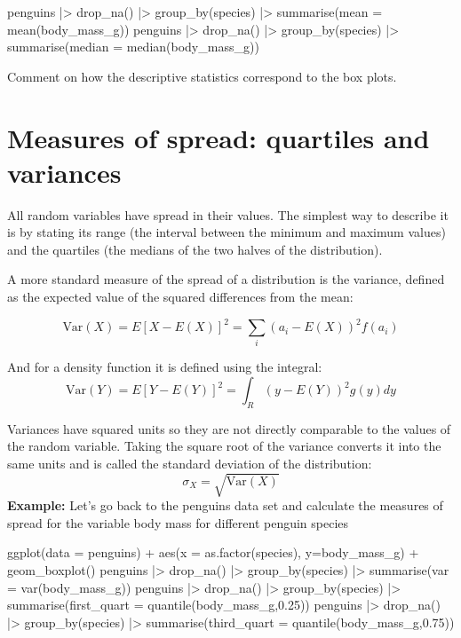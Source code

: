 \documentclass[
  letterpaper,
  DIV=11,
  numbers=noendperiod]{scrreprt}
\newenvironment{Shaded}{\begin{snugshade}}{\end{snugshade}}
\newcommand{\NormalTok}[1]{\textcolor[rgb]{0.00,0.23,0.31}{#1}}
\begin{document}
\begin{Shaded}
\begin{Highlighting}[]
\NormalTok{penguins |\textgreater{} drop\_na() |\textgreater{} group\_by(species) |\textgreater{} summarise(mean = mean(body\_mass\_g))}
\NormalTok{penguins |\textgreater{} drop\_na()  |\textgreater{} group\_by(species) |\textgreater{} summarise(median = median(body\_mass\_g))}
\end{Highlighting}
\end{Shaded}

Comment on how the descriptive statistics correspond to the box plots.

\section{Measures of spread: quartiles and
variances}\label{measures-of-spread-quartiles-and-variances}

All random variables have spread in their values. The simplest way to
describe it is by stating its range (the interval between the minimum
and maximum values) and the quartiles (the medians of the two halves of
the distribution).

A more standard measure of the spread of a distribution is the variance,
defined as the expected value of the squared differences from the mean:

\[\text{Var}(X) = E [X - E(X)]^2 = \sum_i (a_i- E(X))^2 f(a_i)\]

And for a density function it is defined using the integral:
\[\text{Var}(Y) =  E[ Y - E(Y)]^2 = \int_R (y-E(Y))^2 g(y) dy \]

Variances have squared units so they are not directly comparable to the
values of the random variable. Taking the square root of the variance
converts it into the same units and is called the standard deviation of
the distribution: \[ \sigma_X = \sqrt{\text{Var}(X)}\] \textbf{Example:}
Let's go back to the penguins data set and calculate the measures of
spread for the variable body mass for different penguin species

\begin{Shaded}
\begin{Highlighting}[]
\NormalTok{ggplot(data = penguins) + aes(x = as.factor(species), y=body\_mass\_g) + geom\_boxplot()}
\NormalTok{penguins |\textgreater{} drop\_na() |\textgreater{} group\_by(species) |\textgreater{} summarise(var = var(body\_mass\_g))}
\NormalTok{penguins |\textgreater{} drop\_na() |\textgreater{} group\_by(species) |\textgreater{} summarise(first\_quart = quantile(body\_mass\_g,0.25))}
\NormalTok{penguins |\textgreater{} drop\_na() |\textgreater{} group\_by(species) |\textgreater{} summarise(third\_quart = quantile(body\_mass\_g,0.75))}
\end{Highlighting}
\end{Shaded}
\end{document}
